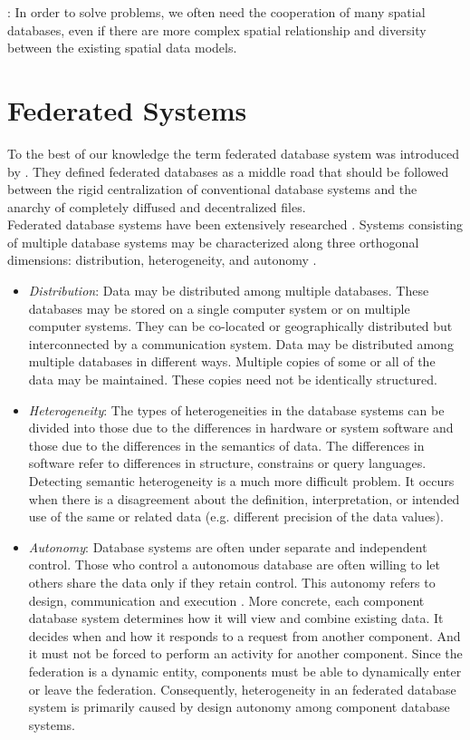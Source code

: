 \documentclass[12pt,a4paper]{report}
\newcommand{\term}{\textit}
\begin{document}
	\citep{Gong}: In order to solve problems, we often need the cooperation of many spatial databases, even if there are more complex spatial relationship and diversity between the existing spatial data models.
	\\



	\section{Federated Systems}
	\label{sec:fed_geodata:fed}
	
	To the best of our knowledge the term federated database system was 
	introduced by \citet{Hammer}. They defined federated databases as a middle 
	road that should be followed between the rigid centralization of 
	conventional database systems and the anarchy of completely diffused and 
	decentralized files.
	\\

	Federated database systems have been extensively researched \citep{Sheth, Litwin}.
	Systems consisting of multiple database systems may be characterized along 
	three orthogonal dimensions: distribution, heterogeneity, and autonomy 
	\citep{Sheth}. 
	\begin{itemize}
		\item \term{Distribution}: Data may be distributed among multiple 
		databases. These databases may be stored on a single computer system or 
		on multiple computer systems. They can be co-located or geographically 
		distributed but interconnected by a communication system. Data may be 
		distributed among multiple databases in different ways. Multiple copies 
		of some or all of the data may be maintained. These copies need not be 
		identically structured.
		\item \term{Heterogeneity}: The types of heterogeneities in the 
		database systems can be divided into those due to the differences in 
		hardware or system software and those due to the differences in the 
		semantics of data. The differences in software refer to differences in 
		structure, constrains or query languages. Detecting semantic 
		heterogeneity is a much more difficult problem. It occurs when there is 
		a disagreement about the definition, interpretation, or intended use of 
		the same or related data (e.g. different precision of the data values). 
		\item \term{Autonomy}: Database systems are often under separate and 
		independent control. Those who control a autonomous database are often 
		willing to let others share the data only if they retain control. This 
		autonomy refers to design, communication and execution 
		\citep{Sheth, Heimbigner}. More concrete, each component database 
		system determines how it will view and combine existing data. It 
		decides when and how it responds to a request from another component. 
		And it must not be forced to perform an activity for another component. 
		Since the federation is a dynamic entity, components must be able to 
		dynamically enter or leave the federation. Consequently, heterogeneity 
		in an federated database system is primarily caused by design autonomy 
		among component database systems. 
	\end{itemize} 
	
\end{document}
